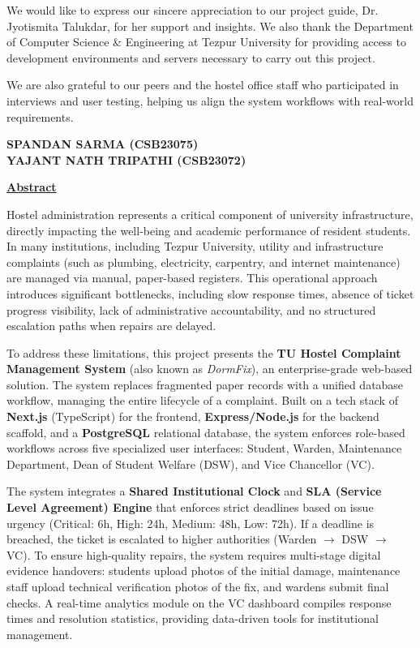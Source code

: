 \documentclass[12pt,a4paper]{article}
\begin{document}
\vspace{1cm}
\noindent
We would like to express our sincere appreciation to our project guide, Dr. Jyotismita Talukdar, for her support and insights. We also thank the Department of Computer Science \& Engineering at Tezpur University for providing access to development environments and servers necessary to carry out this project.

We are also grateful to our peers and the hostel office staff who participated in interviews and user testing, helping us align the system workflows with real-world requirements.

\vspace{2cm}
\noindent
\textbf{SPANDAN SARMA (CSB23075)} \\
\textbf{YAJANT NATH TRIPATHI (CSB23072)}

\newpage
\begin{center}
    \Large \textbf{\underline{Abstract}}
\end{center}

\vspace{1cm}
\noindent
Hostel administration represents a critical component of university infrastructure, directly impacting the well-being and academic performance of resident students. In many institutions, including Tezpur University, utility and infrastructure complaints (such as plumbing, electricity, carpentry, and internet maintenance) are managed via manual, paper-based registers. This operational approach introduces significant bottlenecks, including slow response times, absence of ticket progress visibility, lack of administrative accountability, and no structured escalation paths when repairs are delayed.

To address these limitations, this project presents the \textbf{TU Hostel Complaint Management System} (also known as \textit{DormFix}), an enterprise-grade web-based solution. The system replaces fragmented paper records with a unified database workflow, managing the entire lifecycle of a complaint. Built on a tech stack of \textbf{Next.js} (TypeScript) for the frontend, \textbf{Express/Node.js} for the backend scaffold, and a \textbf{PostgreSQL} relational database, the system enforces role-based workflows across five specialized user interfaces: Student, Warden, Maintenance Department, Dean of Student Welfare (DSW), and Vice Chancellor (VC).

The system integrates a \textbf{Shared Institutional Clock} and \textbf{SLA (Service Level Agreement) Engine} that enforces strict deadlines based on issue urgency (Critical: 6h, High: 24h, Medium: 48h, Low: 72h). If a deadline is breached, the ticket is escalated to higher authorities (Warden $\rightarrow$ DSW $\rightarrow$ VC). To ensure high-quality repairs, the system requires multi-stage digital evidence handovers: students upload photos of the initial damage, maintenance staff upload technical verification photos of the fix, and wardens submit final checks. A real-time analytics module on the VC dashboard compiles response times and resolution statistics, providing data-driven tools for institutional management.
\end{document}
